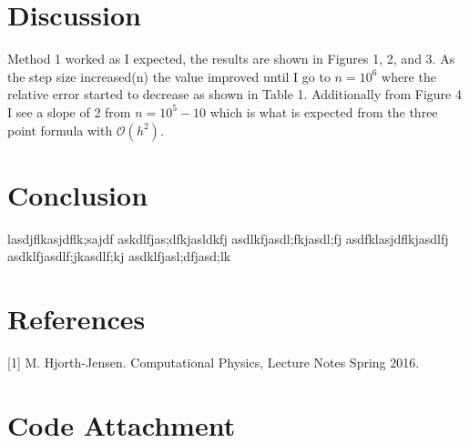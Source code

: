 \documentclass[11pt,a4wide]{article}
\begin{document}
\section{Discussion}
Method 1 worked as I expected, the results are shown in Figures 1, 2, and 3. As the step size increased(n) the value improved until 
I go to $n=10^6$ where the relative error started to decrease as shown in Table 1. Additionally from Figure 4 I see a slope of 2 from $n=10^5-10$ which is what is expected from the three point formula with $\mathcal{O}(h^2)$.

\section{Conclusion}
lasdjflkasjdflk;sajdf
askdlfjas;dfkjasldkfj
asdlkfjasdl;fkjasdl;fj
asdfklasjdflkjasdlfj
asdklfjasdlf;jkasdlf;kj
asdklfjasl;dfjasd;lk
\section{References}
[1] M. Hjorth-Jensen. Computational Physics, Lecture Notes Spring 2016. 

\section{Code Attachment}

\end{document}

